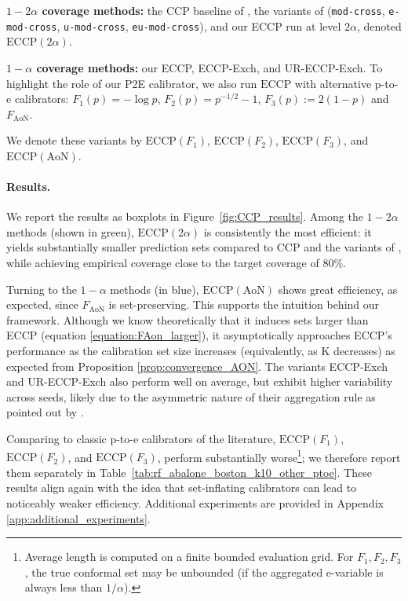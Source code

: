\documentclass{article}
\theoremstyle{plain}
\theoremstyle{definition}
\theoremstyle{remark}
\begin{document}
\textbf{$1-2\alpha$ coverage methods:}  the CCP baseline of \citet{vovk2015cross}, the variants of \citet{gasparinimproving} (\texttt{mod-cross}, \texttt{e-mod-cross}, \texttt{u-mod-cross}, \texttt{eu-mod-cross}), and our ECCP run at level $2\alpha$, denoted $\mathrm{ECCP}(2\alpha)$. 

\textbf{ $1-\alpha$ coverage methods:} our ECCP, ECCP-Exch, and UR-ECCP-Exch.
To highlight the role of our P2E calibrator, we also run $\mathrm{ECCP}$ with alternative p-to-e calibrators: $F_1(p)=-\log p$, $F_2(p)=p^{-1/2}-1$, $F_3(p):=2(1-p)$ and $F_{\mathrm{AoN}}$. 

We denote these variants by $\mathrm{ECCP}(F_1)$, $\mathrm{ECCP}(F_2)$, $\mathrm{ECCP}(F_3)$, and $\mathrm{ECCP}({\mathrm{AoN}})$. 





\paragraph{Results.} We report the results as boxplots in Figure~\ref{fig:CCP_results}. Among the $1-2\alpha$ methods (shown in green), $\mathrm{ECCP}(2\alpha)$ is consistently the most efficient: it yields substantially smaller prediction sets compared to CCP and the variants of \citet{gasparinimproving}, while achieving empirical coverage close to the target coverage of $80\%$. %


Turning to the $1-\alpha$ methods (in blue), $\mathrm{ECCP}(\mathrm{AoN})$ shows great efficiency, as expected, since $F_{\mathrm{AoN}}$ is set-preserving. This supports the intuition behind our framework. Although we know theoretically that it induces sets larger than  ECCP (equation \eqref{equation:FAon_larger}), it asymptotically approaches ECCP's performance as the calibration set size increases (equivalently, as K decreases) as expected from Proposition \ref{prop:convergence_AON}.    The variants ECCP-Exch and UR-ECCP-Exch  also perform well on average, but exhibit higher variability across seeds, likely due to the asymmetric nature of their aggregation rule as pointed out by \citet{gasparinimproving}.






Comparing to classic p-to-e calibrators of the literature, $\mathrm{ECCP}(F_1)$, $\mathrm{ECCP}(F_2)$, and $\mathrm{ECCP}(F_3)$, perform substantially worse\footnote{Average length is computed on a finite bounded evaluation grid. For  $F_1,F_2,F_3$, the true conformal set may be unbounded (if the aggregated e-variable is always less than $1/\alpha$).}; we therefore report them separately in Table~\ref{tab:rf_abalone_boston_k10_other_ptoe}. These results align again with the idea that set-inflating calibrators can lead to noticeably weaker efficiency. Additional experiments are provided in Appendix \ref{app:additional_experiments}.
\end{document}
